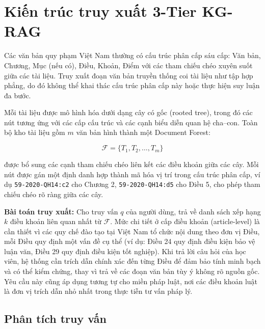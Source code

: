 \section{Kiến trúc truy xuất 3-Tier KG-RAG}
\label{sec:phan-tich-truy-van}

Các văn bản quy phạm Việt Nam thường có cấu trúc phân cấp sáu cấp: Văn bản,
Chương, Mục (nếu có), Điều, Khoản, Điểm với các tham chiếu chéo xuyên suốt giữa
các tài liệu. Truy xuất đoạn văn bản truyền thống coi tài liệu như tập hợp phẳng,
do đó không thể khai thác cấu trúc phân cấp này hoặc thực hiện suy luận đa bước.

Mỗi tài liệu được mô hình hóa dưới dạng cây có gốc (rooted tree), trong đó các
nút tương ứng với các cấp cấu trúc và các cạnh biểu diễn quan hệ cha--con. Toàn
bộ kho tài liệu gồm $m$ văn bản hình thành một Document Forest:

\begin{equation}
  \mathcal{F} = \{T_1, T_2, \ldots, T_m\}
  \label{eq:document-forest}
\end{equation}

\noindent được bổ sung các cạnh tham chiếu chéo liên kết các điều khoản giữa các
cây. Mỗi nút được gán một định danh hợp thành mã hóa vị trí trong cấu trúc phân
cấp, ví dụ \texttt{59-2020-QH14:c2} cho Chương 2, \texttt{59-2020-QH14:d5} cho
Điều 5, cho phép tham chiếu chéo rõ ràng giữa các cây.

\textbf{Bài toán truy xuất:} Cho truy vấn $q$ của người dùng, trả về danh sách
xếp hạng $k$ điều khoản liên quan nhất từ $\mathcal{F}$. Mức chi tiết ở cấp điều
khoản (article-level) là cần thiết vì các quy chế đào tạo tại Việt Nam tổ chức
nội dung theo đơn vị Điều, mỗi Điều quy định một vấn đề cụ thể (ví dụ: Điều 24
quy định điều kiện bảo vệ luận văn, Điều 29 quy định điều kiện tốt nghiệp). Khi
trả lời câu hỏi của học viên, hệ thống cần trích dẫn chính xác đến từng Điều để
đảm bảo tính minh bạch và có thể kiểm chứng, thay vì trả về các đoạn văn bản tùy
ý không rõ nguồn gốc. Yêu cầu này cũng áp dụng tương tự cho miền pháp luật, nơi
các điều khoản luật là đơn vị trích dẫn nhỏ nhất trong thực tiễn tư vấn pháp lý.

\subsection{Phân tích truy vấn}
\label{subsec:phan-tich-truy-van-detail}

